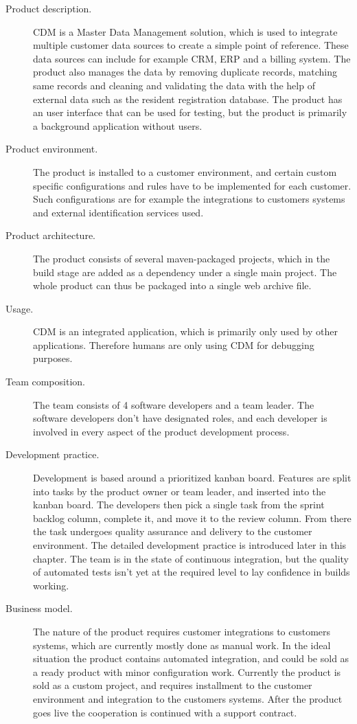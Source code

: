 \documentclass[english]{tktltiki2}
\theoremstyle{definition}
\theoremstyle{remark}
\begin{document}
\begin{description}
  \item[Product description.] CDM is a Master Data Management \cite{loshin2010master} solution, which is used to integrate multiple customer data sources to create a simple point of reference. These data sources can include for example CRM, ERP and a billing system. The product also manages the data by removing duplicate records, matching same records and cleaning and validating the data with the help of external data such as the resident registration database. The product has an user interface that can be used for testing, but the product is primarily a background application without users. 
  \item[Product environment.] The product is installed to a customer environment, and certain custom specific configurations and rules have to be implemented for each customer. Such configurations are for example the integrations to customers systems and external identification services used. 
  \item[Product architecture.] The product consists of several maven-packaged projects, which in the build stage are added as a dependency under a single main project. The whole product can thus be packaged into a single web archive file.
  \item[Usage.] CDM is an integrated application, which is primarily only used by other applications. Therefore humans are only using CDM for debugging purposes.
  \item[Team composition.] The team consists of 4 software developers and a team leader. The software developers don't have designated roles, and each developer is involved in every aspect of the product development process.
  \item[Development practice.] Development is based around a prioritized kanban board. Features are split into tasks by the product owner or team leader, and inserted into the kanban board. The developers then pick a single task from the sprint backlog column, complete it, and move it to the review column. From there the task undergoes quality assurance and delivery to the customer environment. The detailed development practice is introduced later in this chapter. The team is in the state of continuous integration, but the quality of automated tests isn't yet at the required level to lay confidence in builds working. 
  \item[Business model.] The nature of the product requires customer integrations to customers systems, which are currently mostly done as manual work. In the ideal situation the product contains automated integration, and could be sold as a ready product with minor configuration work. Currently the product is sold as a custom project, and requires installment to the customer environment and integration to the customers systems. After the product goes live the cooperation is continued with a support contract.

\end{description}
\end{document}
